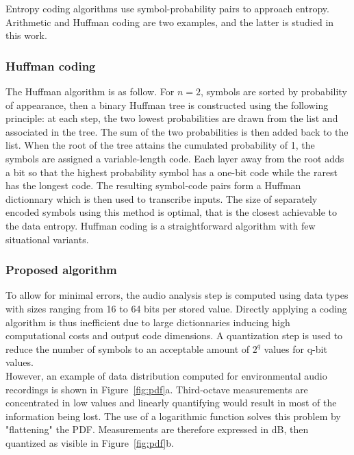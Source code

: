 \documentclass[12pt,times,onecolumn]{article}
\begin{document}
Entropy coding algorithms use symbol-probability pairs to approach entropy. Arithmetic \cite{witten1987} and Huffman \cite{huffman1952} coding are two examples, and the latter is studied in this work.

\subsubsection{Huffman coding}
The Huffman algorithm is as follow. For $n = 2$, symbols are sorted by probability of appearance, then a binary Huffman tree is constructed using the following principle: at each step, the two lowest probabilities are drawn from the list and associated in the tree. The sum of the two probabilities is then added back to the list. When the root of the tree attains the cumulated probability of 1, the symbols are assigned a variable-length code. Each layer away from the root adds a bit so that the highest probability symbol has a one-bit code while the rarest has the longest code. The resulting symbol-code pairs form a Huffman dictionnary which is then used to transcribe inputs. The size of separately encoded symbols using this method is optimal, that is the closest achievable to the data entropy. Huffman coding is a straightforward algorithm with few situational variants.

\subsubsection{Proposed algorithm}
To allow for minimal errors, the audio analysis step is computed using data types with sizes ranging from 16 to 64 bits per stored value. Directly applying a coding algorithm is thus inefficient due to large dictionnaries inducing high computational costs and output code dimensions. A quantization step is used to reduce the number of symbols to an acceptable amount of $2^q$ values for q-bit values.\\

However, an example of data distribution computed for environmental audio recordings is shown in Figure~\ref{fig:pdf}a. Third-octave measurements are concentrated in low values and linearly quantifying would result in most of the information being lost. The use of a logarithmic function solves this problem by "flattening" the PDF. Measurements are therefore expressed in dB, then quantized as visible in Figure~\ref{fig:pdf}b.\\
\end{document}

